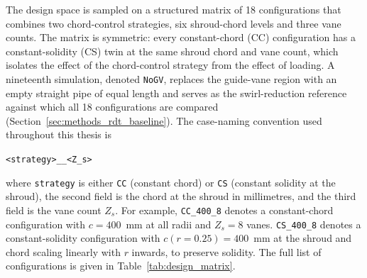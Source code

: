 The design space is sampled on a structured matrix of 18 configurations that combines two chord-control strategies, six shroud-chord levels and three vane counts. The matrix is symmetric: every constant-chord (CC) configuration has a constant-solidity (CS) twin at the same shroud chord and vane count, which isolates the effect of the chord-control strategy from the effect of loading. A nineteenth simulation, denoted \texttt{NoGV}, replaces the guide-vane region with an empty straight pipe of equal length and serves as the swirl-reduction reference against which all 18 configurations are compared (Section~\ref{sec:methods_rdt_baseline}). The case-naming convention used throughout this thesis is
 
\medskip
\centerline{\texttt{<strategy>\_<chord shroud in mm>\_<Z\_s>}}
\medskip
 
\noindent
where \texttt{strategy} is either \texttt{CC} (constant chord) or \texttt{CS} (constant solidity at the shroud), the second field is the chord at the shroud in millimetres, and the third field is the vane count $Z_s$. For example, \texttt{CC\_400\_8} denotes a constant-chord configuration with $c = 400$~mm at all radii and $Z_s = 8$ vanes. \texttt{CS\_400\_8} denotes a constant-solidity configuration with $c(r=0.25) = 400$~mm at the shroud and chord scaling linearly with $r$ inwards, to preserve solidity. The full list of configurations is given in Table~\ref{tab:design_matrix}.
 
